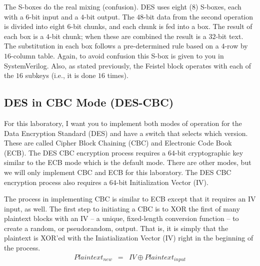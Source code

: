 \documentclass{article}
\begin{document}
The S-boxes do the real mixing (confusion). DES uses eight ($8$)
S-boxes, each
with a $6$-bit input and
a $4$-bit output.  The $48$-bit data from the second operation is divided
into eight $6$-bit chunks, and each chunk is fed into a box. The result
of each box is a $4$-bit chunk; when these are combined the result is a
$32$-bit text. The substitution in each box follows a pre-determined
rule based on a $4$-row by $16$-column table.  Again, to avoid
confusion this S-box is given to you in SystemVerilog.
Also, as stated previously, the Feistel block operates with each of
the $16$ subkeys (i.e., it is done $16$ times).

\subsection{DES in CBC Mode (DES-CBC)}

For this laboratory, I want you to implement both modes of operation
for the Data Encryption Standard (DES) and have a switch that selects
which version.  These are called Cipher Block Chaining (CBC) and
Electronic Code Book (ECB).  The DES CBC encryption process requires a
$64$-bit cryptographic
key similar to the ECB mode which is the default mode.  There are
other modes, but we will only implement CBC and ECB for this laboratory.
The DES CBC encryption process also requires a $64$-bit Initialization
Vector (IV).

The process in implementing CBC is similar to ECB except that it
requires an IV input, as well.
The first step to initiating a CBC is to XOR the first
of many plaintext blocks with an IV -- a unique, fixed-length
conversion function -- to create a random, or pseudorandom, output.
That is, it is simply that the plaintext is XOR'ed with the
Iniatialization Vector (IV) right in the beginning of the process.
\begin{eqnarray*}
  Plaintext_{new} & = & IV \oplus Plaintext_{input}
\end{eqnarray*}
\end{document}
